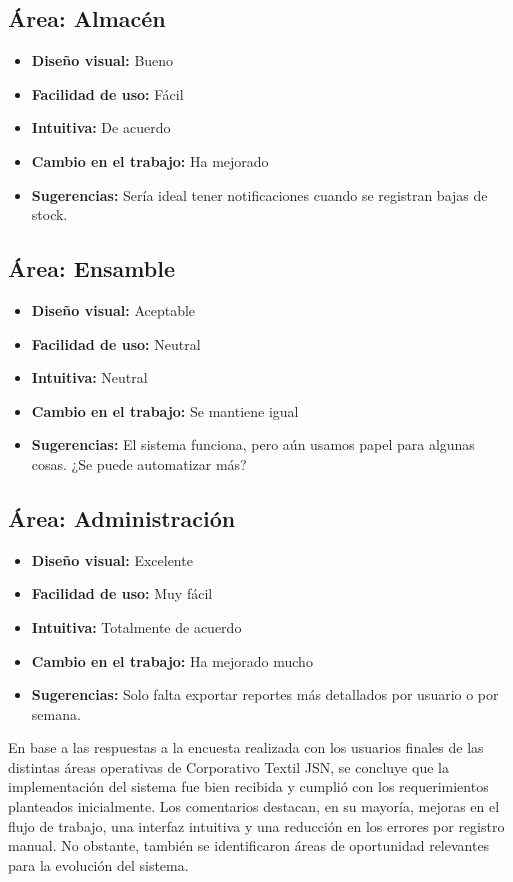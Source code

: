 \documentclass[12pt,letterpaper,spanish]{report}
\begin{document}
\subsection*{Área: Almacén}
\begin{itemize}
    \item \textbf{Diseño visual:} Bueno
    \item \textbf{Facilidad de uso:} Fácil
    \item \textbf{Intuitiva:} De acuerdo
    \item \textbf{Cambio en el trabajo:} Ha mejorado
    \item \textbf{Sugerencias:} Sería ideal tener notificaciones cuando se registran bajas de stock.
\end{itemize}

\subsection*{Área: Ensamble}
\begin{itemize}
    \item \textbf{Diseño visual:} Aceptable
    \item \textbf{Facilidad de uso:} Neutral
    \item \textbf{Intuitiva:} Neutral
    \item \textbf{Cambio en el trabajo:} Se mantiene igual
    \item \textbf{Sugerencias:} El sistema funciona, pero aún usamos papel para algunas cosas. ¿Se puede automatizar más?
\end{itemize}

\subsection*{Área: Administración}
\begin{itemize}
    \item \textbf{Diseño visual:} Excelente
    \item \textbf{Facilidad de uso:} Muy fácil
    \item \textbf{Intuitiva:} Totalmente de acuerdo
    \item \textbf{Cambio en el trabajo:} Ha mejorado mucho
    \item \textbf{Sugerencias:} Solo falta exportar reportes más detallados por usuario o por semana.
\end{itemize}

En base a las respuestas a la encuesta realizada con los usuarios finales de las distintas áreas operativas de Corporativo Textil JSN, se concluye que la implementación del sistema fue bien recibida y cumplió con los requerimientos planteados inicialmente. Los comentarios destacan, en su mayoría, mejoras en el flujo de trabajo, una interfaz intuitiva y una reducción en los errores por registro manual. No obstante, también se identificaron áreas de oportunidad relevantes para la evolución del sistema.
\end{document}
